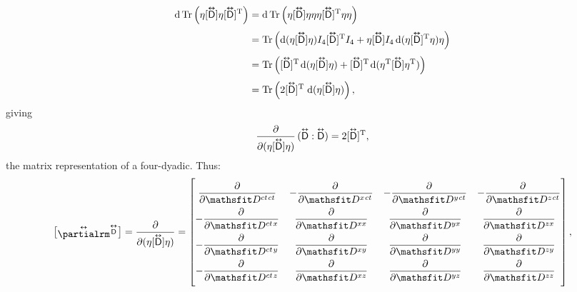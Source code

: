 \documentclass[12pt]{article}
\newcommand{\dd}[1]{\mathrm{d}#1}
\newcommand{\superoverset}[2]{%
  \mathop{#2}\limits^{\vbox to -.5ex{\kern-0.95ex\hbox{$#1$}\vss}}}
\newcommand{\superdy}[1]{\superoverset{\text{\tiny$\bm\leftrightarrow$}}{#1}}
\newcommand{\capdy}[1]{ \overset{ \text{\tiny$\bm\leftrightarrow$} }{\vphantom{\text{\small{A}}}\smash{#1}} }
\begin{document}
\begin{equation*}
\begin{aligned}
\dd \, \mathrm{Tr} \left( \eta [\capdy{\mathsf{D}}] \eta [ \capdy{\mathsf{D}} ]^{\mathrm{T}} \right) &= \dd \, \mathrm{Tr} \left( \eta [\capdy{\mathsf{D}}] \eta \eta \eta [ \capdy{\mathsf{D}} ]^{\mathrm{T}} \eta \eta \right) \\[3pt]
&= \mathrm{Tr} \left( \dd (\eta [\capdy{\mathsf{D}}] \eta ) I_4 [ \capdy{\mathsf{D}} ]^{\mathrm{T}} I_4 +  \eta [\capdy{\mathsf{D}}] I_4 \, \dd ( \eta [\capdy{\mathsf{D}}]^\mathrm{T} \eta ) \eta \right) \\[3pt]
&= \mathrm{Tr} \left( [ \capdy{\mathsf{D}} ]^{\mathrm{T}} \mkern2mu \dd (\eta [\capdy{\mathsf{D}}] \eta ) + [\capdy{\mathsf{D}}]^{\mathrm{T}} \mkern2mu \dd ( \eta^{\mathrm{T}} [\capdy{\mathsf{D}}] \eta^{\mathrm{T}} ) \right) \\[3pt]
&= \mathrm{Tr} \left( 2 [\capdy{\mathsf{D}}]^\mathrm{T} \; \dd (\eta [\capdy{\mathsf{D}}] \eta ) \right) ,
\end{aligned}
\end{equation*}
giving
\begin{equation*}
\dfrac{\partial}{\partial (\eta [ \capdy{\mathsf{D}} ] \eta)} \, ( \capdy{\mathsf{D}} : \capdy{\mathsf{D}} ) = 2 [\capdy{\mathsf{D}}]^\mathrm{T} ,
\end{equation*}
the matrix representation of a four-dyadic. Thus:
\begin{equation*}
\begin{bmatrix}
\capdy{\partialrm} {}^{\superdy{\mathsf{D}}} \\[-.375ex]
\end{bmatrix}
=
\dfrac{\partial}{\partial (\eta [ \capdy{\mathsf{D}} ] \eta)}
=
\begin{bmatrix}
\\[-2ex]
\dfrac{\partial}{\partial \mathsfit D^{ct \mkern1.5mu ct}} & -\dfrac{\partial}{\partial \mathsfit D^{x \mkern1.5mu ct}} & -\dfrac{\partial}{\partial \mathsfit D^{y \mkern1.5mu ct}} & -\dfrac{\partial}{\partial \mathsfit D^{z \mkern1.5mu ct}} \\[2ex]
-\dfrac{\partial}{\partial \mathsfit D^{ct \mkern1.5mu x}} & \dfrac{\partial}{\partial \mathsfit D^{x x}} & \dfrac{\partial}{\partial \mathsfit D^{y x}} & \dfrac{\partial}{\partial \mathsfit D^{z x}}  \\[2ex]
-\dfrac{\partial}{\partial \mathsfit D^{ct \mkern1.5mu y}} & \dfrac{\partial}{\partial \mathsfit D^{x y}} & \dfrac{\partial}{\partial \mathsfit D^{y y}} & \dfrac{\partial}{\partial \mathsfit D^{z y}}  \\[2ex]
-\dfrac{\partial}{\partial \mathsfit D^{ct \mkern1.5mu z}} & \dfrac{\partial}{\partial \mathsfit D^{x z}} & \dfrac{\partial}{\partial \mathsfit D^{y z}} & \dfrac{\partial}{\partial \mathsfit D^{z z}} \\[2ex]
\end{bmatrix} ,
\end{equation*}
\end{document}
